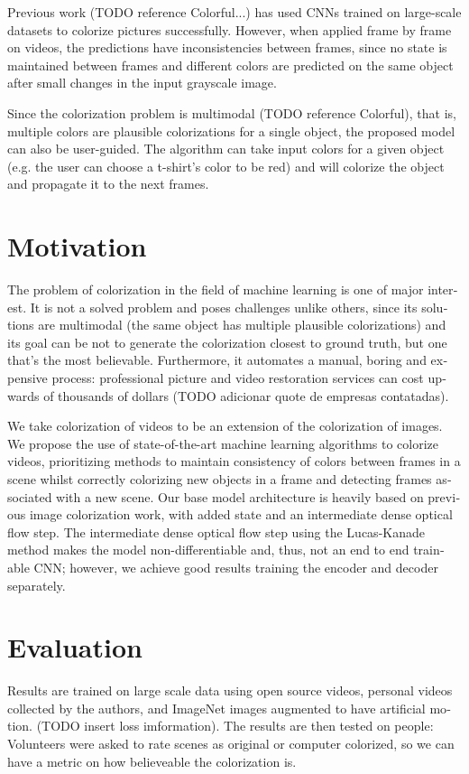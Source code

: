 \documentclass[12pt,openright,twoside,a4paper,english]{abntex2}
\begin{document}
\begin{otherlanguage}{english}
Previous work (TODO reference Colorful...) has used CNNs trained on large-scale datasets to colorize pictures successfully. However, when applied frame by frame on videos, the predictions have inconsistencies between frames, since no state is maintained between frames and different colors are predicted on the same object after small changes in the input grayscale image.

Since the colorization problem is multimodal (TODO reference Colorful), that is, multiple colors are plausible colorizations for a single object, the proposed model can also be user-guided. The algorithm can take input colors for a given object (e.g. the user can choose a t-shirt's color to be red) and will colorize the object and propagate it to the next frames.

\section{Motivation} \label{sec:Motivation}
The problem of colorization in the field of machine learning is one of major interest. It is not a solved problem and poses challenges unlike others, since its solutions are multimodal (the same object has multiple plausible colorizations) and its goal can be not to generate the colorization closest to ground truth, but one that's the most believable. Furthermore, it automates a manual, boring and expensive process: professional picture and video restoration services can cost upwards of thousands of dollars (TODO adicionar quote de empresas contatadas).

We take colorization of videos to be an extension of the colorization of images. We propose the use of state-of-the-art machine learning algorithms to colorize videos, prioritizing methods to maintain consistency of colors between frames in a scene whilst correctly colorizing new objects in a frame and detecting frames associated with a new scene. Our base model architecture is heavily based on previous image colorization work, with added state and an intermediate dense optical flow step. The intermediate dense optical flow step using the Lucas-Kanade method makes the model non-differentiable and, thus, not an end to end trainable CNN; however, we achieve good results training the encoder and decoder separately.

\section{Evaluation}
Results are trained on large scale data using open source videos, personal videos collected by the authors, and ImageNet images augmented to have artificial motion. (TODO insert loss imformation). The results are then tested on people: Volunteers were asked to rate scenes as original or computer colorized, so we can have a metric on how believeable the colorization is.


\end{otherlanguage}
\end{document}
